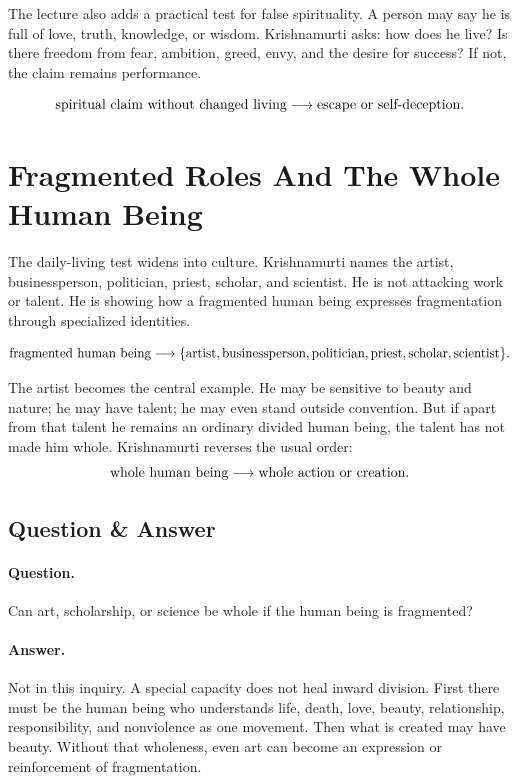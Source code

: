 \documentclass[11pt,oneside]{book}
\begin{document}
The lecture also adds a practical test for false spirituality. A person may say he is full of love, truth, knowledge, or wisdom. Krishnamurti asks: how does he live? Is there freedom from fear, ambition, greed, envy, and the desire for success? If not, the claim remains performance.

\begin{equation}
\hbox{spiritual claim without changed living}
\longrightarrow
\hbox{escape or self-deception}.
\end{equation}

\section{Fragmented Roles And The Whole Human Being}

The daily-living test widens into culture. Krishnamurti names the artist, businessperson, politician, priest, scholar, and scientist. He is not attacking work or talent. He is showing how a fragmented human being expresses fragmentation through specialized identities.

\begin{equation}
\hbox{fragmented human being}
\longrightarrow
\{\hbox{artist},\hbox{businessperson},\hbox{politician},
\hbox{priest},\hbox{scholar},\hbox{scientist}\}.
\end{equation}

The artist becomes the central example. He may be sensitive to beauty and nature; he may have talent; he may even stand outside convention. But if apart from that talent he remains an ordinary divided human being, the talent has not made him whole. Krishnamurti reverses the usual order:
\begin{equation}
\hbox{whole human being}
\longrightarrow
\hbox{whole action or creation}.
\end{equation}

\subsection{Question \& Answer}

\paragraph{Question.}
Can art, scholarship, or science be whole if the human being is fragmented?

\paragraph{Answer.}
Not in this inquiry. A special capacity does not heal inward division. First there must be the human being who understands life, death, love, beauty, relationship, responsibility, and nonviolence as one movement. Then what is created may have beauty. Without that wholeness, even art can become an expression or reinforcement of fragmentation.
\end{document}
